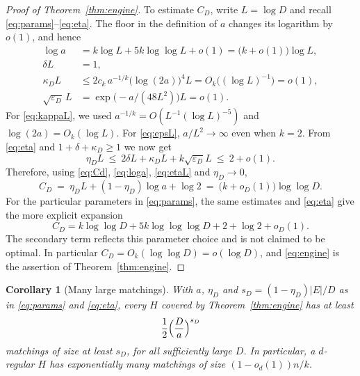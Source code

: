 \documentclass[11pt,a4paper]{amsart}
\theoremstyle{plain}
\newtheorem{corollary}[theorem]{Corollary}
\theoremstyle{definition}
\theoremstyle{remark}
\newcommand{\EE}{E}
\begin{document}
\begin{proof}[Proof of Theorem~\ref{thm:engine}]
To estimate $C_D$, write $L=\log D$ and recall \eqref{eq:params}--\eqref{eq:eta}.
The floor in the definition of $a$ changes its logarithm by $o(1)$, and hence
\begin{align}
  \log a
    &=k\log L+5k\log\log L+o(1)
      =\bigl(k+o(1)\bigr)\log L, \label{eq:loga}\\
  \delta L&=1, \label{eq:deltaL}\\
  \kappa_D L
    &\le 2c_k\,a^{-1/k}\bigl(\log(2a)\bigr)^4L
      =O_k\bigl((\log L)^{-1}\bigr)=o(1), \label{eq:kappaL}\\
  \sqrt{\varepsilon_D}\,L
    &=\exp\bigl(-a/(48L^2)\bigr)L=o(1). \label{eq:epsL}
\end{align}
For \eqref{eq:kappaL}, we used
$a^{-1/k}=O(L^{-1}(\log L)^{-5})$ and $\log(2a)=O_k(\log L)$. For
\eqref{eq:epsL}, $a/L^2\to\infty$ even when $k=2$. From \eqref{eq:eta} and
$1+\delta+\kappa_D\ge1$ we now get
\begin{equation}
\label{eq:etaL}
  \eta_D L\ \le\ 2\delta L+\kappa_D L+k\sqrt{\varepsilon_D}L\ \le\ 2+o(1).
\end{equation}
Therefore, using \eqref{eq:Cd}, \eqref{eq:loga}, \eqref{eq:etaL} and $\eta_D\to0$,
\begin{equation}
\label{eq:Casymp}
  C_D\ =\ \eta_DL+(1-\eta_D)\log a+\log2
  \ =\ \bigl(k+o_D(1)\bigr)\log\log D .
\end{equation}
For the particular parameters in \eqref{eq:params}, the same estimates and
\eqref{eq:eta} give the more explicit expansion
\[
  C_D=k\log\log D+5k\log\log\log D+2+\log2+o_D(1).
\]
The secondary term reflects this parameter choice and is not claimed to be optimal.
In particular $C_D=O_k(\log\log D)=o(\log D)$, and \eqref{eq:engine} is the assertion of
Theorem~\ref{thm:engine}.
\end{proof}

\begin{corollary}[Many large matchings]
\label{cor:manylarge}
With $a$, $\eta_D$ and $s_D=(1-\eta_D)|\EE|/D$ as in
\eqref{eq:params} and \eqref{eq:eta}, every $H$ covered by
Theorem~\ref{thm:engine} has at least
\[
  \frac12\Bigl(\frac{D}{a}\Bigr)^{s_D}
\]
matchings of size at least $s_D$, for all sufficiently large $D$.
In particular, a $d$-regular $H$ has exponentially many matchings of size
$(1-o_d(1))n/k$.
\end{corollary}
\end{document}
